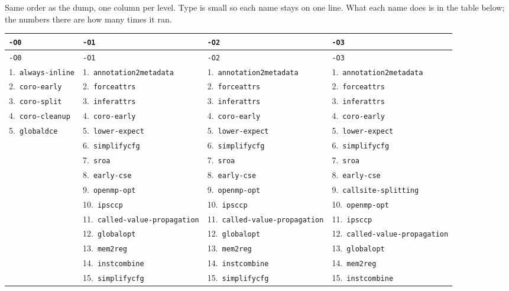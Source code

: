 \documentclass[11pt,a4paper]{article}
\begin{document}
Same order as the dump, one column per level. Type is small so each
name stays on one line. What each name does is in the table below;
the numbers there are how many times it ran.

{\fontsize{5.4pt}{6.6pt}\selectfont
\setlength{\tabcolsep}{5pt}
\renewcommand{\arraystretch}{1.15}
\begin{longtable}{llll}
\hline
\texttt{-O0} & \texttt{-O1} & \texttt{-O2} & \texttt{-O3} \\
\hline
\endfirsthead
\hline
\texttt{-O0} & \texttt{-O1} & \texttt{-O2} & \texttt{-O3} \\
\hline
\endhead
1.~\texttt{always-inline} & 1.~\texttt{annotation2metadata} & 1.~\texttt{annotation2metadata} & 1.~\texttt{annotation2metadata} \\
2.~\texttt{coro-early} & 2.~\texttt{forceattrs} & 2.~\texttt{forceattrs} & 2.~\texttt{forceattrs} \\
3.~\texttt{coro-split} & 3.~\texttt{inferattrs} & 3.~\texttt{inferattrs} & 3.~\texttt{inferattrs} \\
4.~\texttt{coro-cleanup} & 4.~\texttt{coro-early} & 4.~\texttt{coro-early} & 4.~\texttt{coro-early} \\
5.~\texttt{globaldce} & 5.~\texttt{lower-expect} & 5.~\texttt{lower-expect} & 5.~\texttt{lower-expect} \\
 & 6.~\texttt{simplifycfg} & 6.~\texttt{simplifycfg} & 6.~\texttt{simplifycfg} \\
 & 7.~\texttt{sroa} & 7.~\texttt{sroa} & 7.~\texttt{sroa} \\
 & 8.~\texttt{early-cse} & 8.~\texttt{early-cse} & 8.~\texttt{early-cse} \\
 & 9.~\texttt{openmp-opt} & 9.~\texttt{openmp-opt} & 9.~\texttt{callsite-splitting} \\
 & 10.~\texttt{ipsccp} & 10.~\texttt{ipsccp} & 10.~\texttt{openmp-opt} \\
 & 11.~\texttt{called-value-propagation} & 11.~\texttt{called-value-propagation} & 11.~\texttt{ipsccp} \\
 & 12.~\texttt{globalopt} & 12.~\texttt{globalopt} & 12.~\texttt{called-value-propagation} \\
 & 13.~\texttt{mem2reg} & 13.~\texttt{mem2reg} & 13.~\texttt{globalopt} \\
 & 14.~\texttt{instcombine} & 14.~\texttt{instcombine} & 14.~\texttt{mem2reg} \\
 & 15.~\texttt{simplifycfg} & 15.~\texttt{simplifycfg} & 15.~\texttt{instcombine} \\

\end{longtable}}
\end{document}
